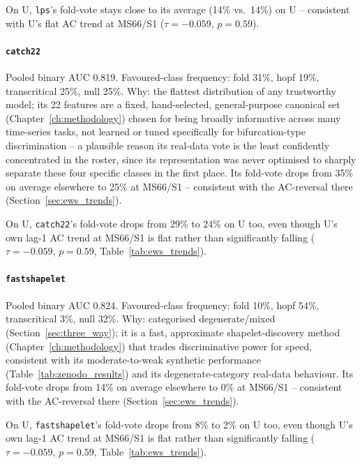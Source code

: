 On U, \texttt{lps}'s fold-vote stays close to its average (14\% vs.\ 14\%) on U -- consistent with U's flat AC trend at MS66/S1 ($\tau=-0.059$, $p=0.59$).

\paragraph{\texttt{catch22}} Pooled binary AUC 0.819. Favoured-class frequency: fold 31\%, hopf 19\%, transcritical 25\%, null 25\%. Why: the flattest distribution of any trustworthy model; its 22 features are a fixed, hand-selected, general-purpose canonical set (Chapter~\ref{ch:methodology}) chosen for being broadly informative across many time-series tasks, not learned or tuned specifically for bifurcation-type discrimination -- a plausible reason its real-data vote is the least confidently concentrated in the roster, since its representation was never optimised to sharply separate these four specific classes in the first place. Its fold-vote drops from 35\% on average elsewhere to 25\% at MS66/S1 -- consistent with the AC-reversal there (Section~\ref{sec:ews_trends}).

On U, \texttt{catch22}'s fold-vote drops from 29\% to 24\% on U too, even though U's own lag-1 AC trend at MS66/S1 is flat rather than significantly falling ($\tau=-0.059$, $p=0.59$, Table~\ref{tab:ews_trends}).

\paragraph{\texttt{fastshapelet}} Pooled binary AUC 0.824. Favoured-class frequency: fold 10\%, hopf 54\%, transcritical 3\%, null 32\%. Why: categorised degenerate/mixed (Section~\ref{sec:three_way}); it is a fast, approximate shapelet-discovery method (Chapter~\ref{ch:methodology}) that trades discriminative power for speed, consistent with its moderate-to-weak synthetic performance (Table~\ref{tab:zenodo_results}) and its degenerate-category real-data behaviour. Its fold-vote drops from 14\% on average elsewhere to 0\% at MS66/S1 -- consistent with the AC-reversal there (Section~\ref{sec:ews_trends}).

On U, \texttt{fastshapelet}'s fold-vote drops from 8\% to 2\% on U too, even though U's own lag-1 AC trend at MS66/S1 is flat rather than significantly falling ($\tau=-0.059$, $p=0.59$, Table~\ref{tab:ews_trends}).

